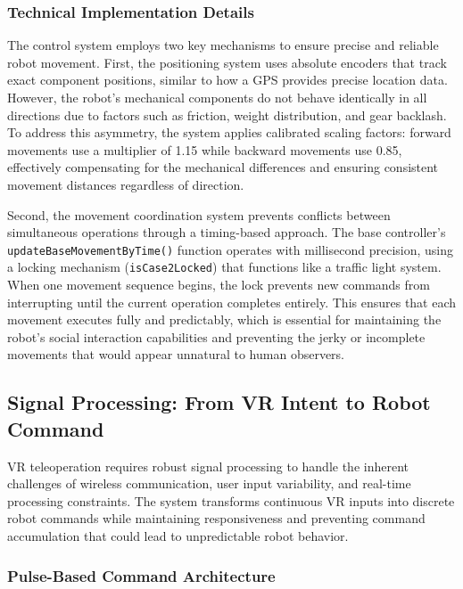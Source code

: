 \subsubsection{Technical Implementation Details}

The control system employs two key mechanisms to ensure precise and reliable robot movement. First, the positioning system uses absolute encoders that track exact component positions, similar to how a GPS provides precise location data. However, the robot's mechanical components do not behave identically in all directions due to factors such as friction, weight distribution, and gear backlash. To address this asymmetry, the system applies calibrated scaling factors: forward movements use a multiplier of 1.15 while backward movements use 0.85, effectively compensating for the mechanical differences and ensuring consistent movement distances regardless of direction.

Second, the movement coordination system prevents conflicts between simultaneous operations through a timing-based approach. The base controller's \texttt{updateBaseMovement}\linebreak\texttt{ByTime()} function operates with millisecond precision, using a locking mechanism (\texttt{isCase}\linebreak\texttt{2Locked}) that functions like a traffic light system. When one movement sequence begins, the lock prevents new commands from interrupting until the current operation completes entirely. This ensures that each movement executes fully and predictably, which is essential for maintaining the robot's social interaction capabilities and preventing the jerky or incomplete movements that would appear unnatural to human observers.

\subsection{Signal Processing: From VR Intent to Robot Command}

VR teleoperation requires robust signal processing to handle the inherent challenges of wireless communication, user input variability, and real-time processing constraints. The system transforms continuous VR inputs into discrete robot commands while maintaining responsiveness and preventing command accumulation that could lead to unpredictable robot behavior.

\subsubsection{Pulse-Based Command Architecture}

